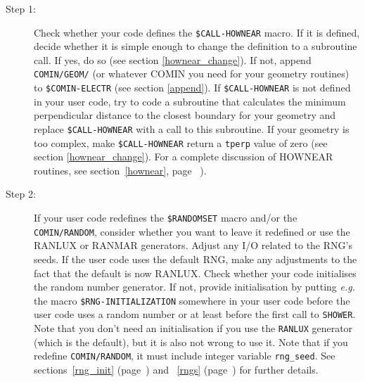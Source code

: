 \begin{description}

\item[Step 1:]
Check whether your code defines the {\tt \$CALL-HOWNEAR} macro.
If it is defined, decide whether it is simple enough to change
the definition to a subroutine call. If yes, do so (see section
\ref{hownear_change}). If not, append {\tt COMIN/GEOM/} (or whatever COMIN you
need for your geometry routines) to
{\tt \$COMIN-ELECTR} (see section \ref{append}).
If {\tt \$CALL-HOWNEAR} is not defined in your user code, try
to code a subroutine that calculates the minimum perpendicular
distance to the closest boundary for your
geometry and replace {\tt \$CALL-HOWNEAR}
with a call to this subroutine. If your geometry is too
complex, make {\tt \$CALL-HOWNEAR} return a {\tt tperp} value of zero
(see section \ref{hownear_change}).
For a complete discussion of HOWNEAR routines,
see section~\ref{hownear}, page ~\pageref{hownear}).
 

\item[Step 2:]
  
If your user code redefines the {\tt \$RANDOMSET} macro and/or the {\tt
COMIN/RANDOM}, consider whether you
want to leave it redefined or use the RANLUX or RANMAR generators. Adjust
any I/O related to the RNG's seeds.  If the user code uses the default RNG,
make any adjustments to the fact that the default is now RANLUX.
Check whether your code initialises the random number generator.
If not, provide initialisation by putting {\em e.g.} the
macro {\tt \$RNG-INITIALIZATION} somewhere in your user code
before the user code uses a random number or at least before
the first call to {\tt SHOWER}. Note that you don't
need an initialisation if you use the {\tt RANLUX} generator (which is the
default), but it is also not wrong to use it. Note that if you redefine
{\tt COMIN/RANDOM}, it must include integer variable {\tt rng\_seed}.
See sections~\ref{rng_init}
(page~\pageref{rng_init}) and ~\ref{rngs} (page~\pageref{rngs})
for further details.


\end{description}
